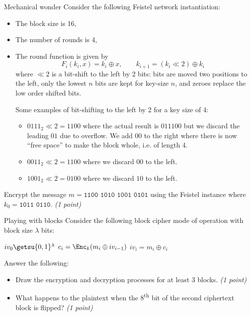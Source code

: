 \documentclass{homework}
\begin{document}
\begin{task}{Mechanical wonder}
  Consider the following Feistel network instantiation:
  \begin{itemize}
    \item The block size is 16,
    \item The number of rounds is 4,
    \item The round function is given by
    \[
      F_i(k_i, x) = k_i \oplus x,\qquad k_{i+1} = (k_i \ll 2) \oplus k_i
    \]
    where $\ll 2$ is a bit-shift to the left by 2 bits: bits are moved two positions to the left, only the lowest $n$ bits are kept for key-size $n$, and zeroes replace the low order shifted bits.

    Some examples of bit-shifting to the left by 2 for a key size of 4:
    \begin{itemize}
      \item $0111_2 \ll 2 = 1100$ where the actual result is $011100$ but we discard the leading $01$ due to overflow.
      We add $00$ to the right where there is now \enquote{free space} to make the block whole, i.e. of length 4.
      \item $0011_2 \ll 2 = 1100$ where we discard $00$ to the left.
      \item $1001_2 \ll 2 = 0100$ where we discard $10$ to the left.
    \end{itemize}
  \end{itemize}

  Encrypt the message $m=\texttt{1100 1010 1001 0101}$ using the Feistel instance where $k_0=\texttt{1011 0110}$.
  \textit{(1 point)}
\end{task}

\begin{task}{Playing with blocks}
  Consider the following block cipher mode of operation with block size $\lambda$ bits:
  \begin{algorithmic}[1]
    \State $iv_0 \getsu \{0,1\}^\lambda$
      \State $c_i = \Enc_k(m_i \oplus iv_{i-1})$
      \State $iv_i = m_i \oplus c_i$
    \EndFor
    \State{}
    \EndProcedure
  \end{algorithmic}

  Answer the following:
  \begin{itemize}
    \item Draw the encryption and decryption processes for at least 3 blocks.
    \textit{(1 point)}
    \item What happens to the plaintext when the 8\textsuperscript{th} bit of the second ciphertext block is flipped?
    \textit{(1 point)}
  \end{itemize}
\end{task}
\end{document}
